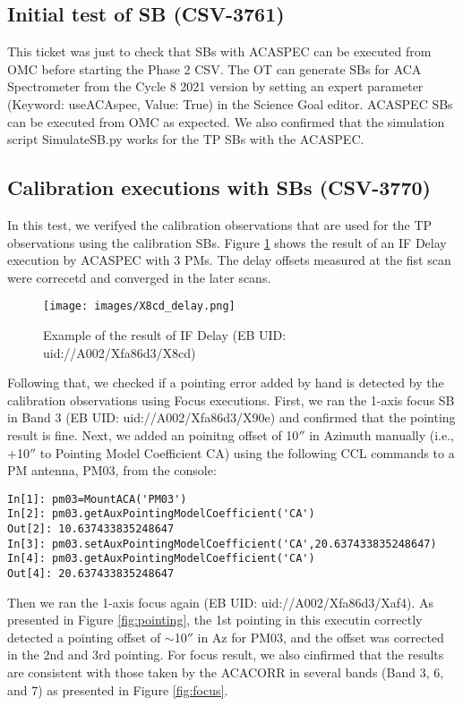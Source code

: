 \subsection{Initial test of SB (CSV-3761)}
This ticket was just to check that SBs with ACASPEC can be executed from OMC before starting the Phase 2 CSV. The OT can generate SBs for ACA Spectrometer from the Cycle 8 2021 version by setting an expert parameter (Keyword: useACAspec, Value: True) in the Science Goal editor. ACASPEC SBs can be executed from OMC as expected.
We also confirmed that the simulation script SimulateSB.py works for the TP SBs with the ACASPEC.    

\subsection{Calibration executions with SBs (CSV-3770)}\label{sec:cal_SB}
In this test, we verifyed the calibration observations that are used for the TP observations using the calibration SBs.
Figure \ref{fig:IFDelay} shows the result of an IF Delay execution by ACASPEC with 3 PMs. The delay offsets measured at the fist scan were correcetd and converged in the later scans.   

\begin{figure}[htbp]
     \centering
     \texttt{[image: images/X8cd\_delay.png]}
     \caption{Example of the result of IF Delay (EB UID: uid://A002/Xfa86d3/X8cd)}
     \label{fig:IFDelay}
\end{figure}

Following that, we checked if a pointing error added by hand is detected by the calibration observations using Focus executions. First, we ran the 1-axis focus SB in Band 3 (EB UID: uid://A002/Xfa86d3/X90e) and confirmed that the pointing result is fine. Next, we added an poinitng offset of 10$''$ in Azimuth manually (i.e., +10$''$ to Pointing Model Coefficient CA) using the following CCL commands to a PM antenna, PM03, from the console: 
\begin{verbatim}
In[1]: pm03=MountACA('PM03') 
In[2]: pm03.getAuxPointingModelCoefficient('CA') 
Out[2]: 10.637433835248647
In[3]: pm03.setAuxPointingModelCoefficient('CA',20.637433835248647) 
In[4]: pm03.getAuxPointingModelCoefficient('CA') 
Out[4]: 20.637433835248647
\end{verbatim}
Then we ran the 1-axis focus again (EB UID: uid://A002/Xfa86d3/Xaf4). As presented in Figure \ref{fig:pointing}, the 1st pointing in this executin correctly detected a pointing offset of $\sim$10$''$ in Az for PM03, and the offset was corrected in the 2nd and 3rd pointing. For focus result, we also cinfirmed that the results are consistent with those taken by the ACACORR in several bands (Band 3, 6, and 7) as presented in Figure \ref{fig:focus}.

